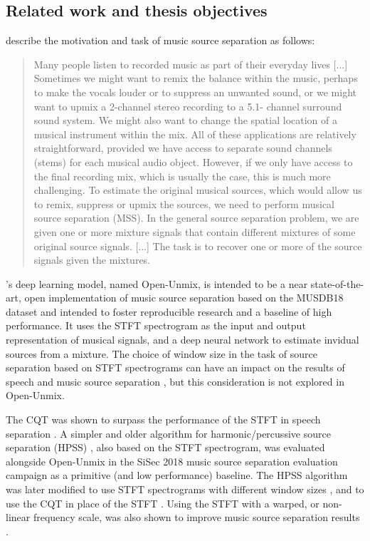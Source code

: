 \documentclass[report.tex]{subfiles}
\begin{document}
\subsection{Related work and thesis objectives}


\textcite{musicsepgood} describe the motivation and task of music source separation as follows:

\begin{quote}
	Many people listen to recorded music as part of their everyday lives [...] Sometimes we might want to remix the balance within the music, perhaps to make the vocals louder or to suppress an unwanted sound, or we might want to upmix a 2-channel stereo recording to a 5.1- channel surround sound system. We might also want to change the spatial location of a musical instrument within the mix. All of these applications are relatively straightforward, provided we have access to separate sound channels (stems) for each musical audio object. However, if we only have access to the final recording mix, which is usually the case, this is much more challenging. To estimate the original musical sources, which would allow us to remix, suppress or upmix the sources, we need to perform musical source separation (MSS). In the general source separation problem, we are given one or more mixture signals that contain different mixtures of some original source signals. [...] The task is to recover one or more of the source signals given the mixtures.
\end{quote}

\textcite{umx}'s deep learning model, named Open-Unmix, is intended to be a near state-of-the-art, open implementation of music source separation based on the MUSDB18 dataset \cite{musdb18} and intended to foster reproducible research and a baseline of high performance. It uses the STFT spectrogram as the input and output representation of musical signals, and a deep neural network to estimate invidual sources from a mixture. The choice of window size in the task of source separation based on STFT spectrograms can have an impact on the results of speech and music source separation \cite{musicsepwindow}, but this consideration is not explored in Open-Unmix.

The CQT was shown to surpass the performance of the STFT in speech separation \cite{cqtseparation}. A simpler and older algorithm for harmonic/percussive source separation (HPSS) \cite{fitzgerald1}, also based on the STFT spectrogram, was evaluated alongside Open-Unmix in the SiSec 2018 music source separation evaluation campaign \cite{sisec2018} as a primitive (and low performance) baseline. The HPSS algorithm was later modified to use STFT spectrograms with different window sizes \cite{driedger, fitzgerald2}, and to use the CQT in place of the STFT \cite{fitzgerald2}. Using the STFT with a warped, or non-linear frequency scale, was also shown to improve music source separation results \cite{bettermusicsep}.
\end{document}
